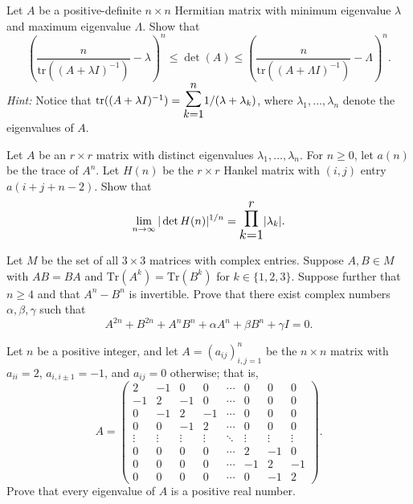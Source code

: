 \documentclass[12pt]{article}
\let\oldsum\sum
\let\oldprod\prod
\renewcommand{\sum}{\mathlarger{\mathlarger{\oldsum}}}
\renewcommand{\prod}{\mathlarger{\mathlarger{\oldprod}}}
\begin{document}
\begin{problem}
Let $A$ be a positive-definite $n \times n$ Hermitian matrix with minimum eigenvalue $\lambda$ and maximum eigenvalue $\Lambda$. Show that
\[
\left( \frac{n}{\mathrm{tr}((A+\lambda I)^{-1})} - \lambda \right)^n \leq \det(A) \leq \left( \frac{n}{\mathrm{tr}((A+\Lambda I)^{-1})} - \Lambda \right)^n.
\]
\textit{Hint:} Notice that $\mathrm{tr}((A+\lambda I)^{-1}) = \sum_{k=1}^{n} 1/(\lambda + \lambda_k)$, where $\lambda_1, \ldots, \lambda_n$ denote the eigenvalues of $A$.
\end{problem}

\begin{problem}
Let $A$ be an $r \times r$ matrix with distinct eigenvalues $\lambda_1, \ldots, \lambda_n$. For $n \geq 0$, let $a(n)$ be the trace of $A^n$. Let $H(n)$ be the $r \times r$ Hankel matrix with $(i,j)$ entry $a(i+j+n-2)$. Show that
\[
\lim_{n \to \infty} |\det H(n)|^{1/n} = \prod_{k=1}^{r} |\lambda_k|.
\]
\end{problem}

\begin{problem}
Let $M$ be the set of all $3 \times 3$ matrices with complex entries. Suppose $A, B \in M$ with $AB = BA$ and $\mathrm{Tr}(A^k) = \mathrm{Tr}(B^k)$ for $k \in \{1,2,3\}$. Suppose further that $n \geq 4$ and that $A^n - B^n$ is invertible. Prove that there exist complex numbers $\alpha, \beta, \gamma$ such that
\[
A^{2n} + B^{2n} + A^n B^n + \alpha A^n + \beta B^n + \gamma I = 0.
\]
\end{problem}

\begin{problem}
Let $n$ be a positive integer, and let $A = (a_{ij})_{i,j=1}^n$ be the $n\times n$ matrix with $a_{ii} = 2$, $a_{i,i\pm 1} = -1$, and $a_{ij} = 0$ otherwise; that is,
\[
A = \begin{pmatrix}
2 & -1 & 0 & 0 & \cdots & 0 & 0 & 0 \\
-1 & 2 & -1 & 0 & \cdots & 0 & 0 & 0 \\
0 & -1 & 2 & -1 & \cdots & 0 & 0 & 0 \\
0 & 0 & -1 & 2 & \cdots & 0 & 0 & 0 \\
\vdots & \vdots & \vdots & \vdots & \ddots & \vdots & \vdots & \vdots \\
0 & 0 & 0 & 0 & \cdots & 2 & -1 & 0 \\
0 & 0 & 0 & 0 & \cdots & -1 & 2 & -1 \\
0 & 0 & 0 & 0 & \cdots & 0 & -1 & 2
\end{pmatrix}.
\]
Prove that every eigenvalue of $A$ is a positive real number.
\end{problem}
\end{document}
